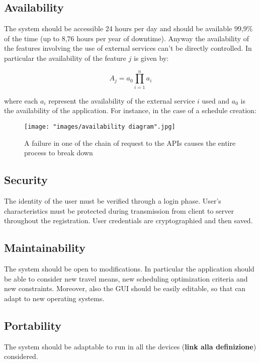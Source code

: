\subsection{Availability}
The system should be accessible 24 hours per day and should be available 99,9\% of the time (up to 8,76 hours per year of downtime). Anyway the availability of the features involving the use of external services can't be directly controlled. In particular the availability of the feature $j$ is given by:

\begin{equation}
A_j = a_0 \prod_{i=1}^n a_i 
\end{equation} 

where each $a_i$ represent the availability of the external service $i$ used and $a_0$ is the availability of the application. For instance, in the case of a schedule creation:

\begin{figure}[H]
\begin{center}
\texttt{[image: "images/availability diagram".jpg]}
\caption{A failure in one of the chain of request to the APIs causes the entire process to break down}
\end{center}
\end{figure}

\subsection{Security}
The identity of the user must be verified through a login phase.
User's characteristics must be protected during transmission from client to server throughout the registration. User credentials are cryptographied and then saved.
\subsection{Maintainability}
The system should be open to modifications.
In particular the application should be able to consider new travel means, new scheduling optimization criteria and new constraints.
Moreover, also the GUI should be easily editable, so that can adapt to new operating systems.

\subsection{Portability}
The system should be adaptable to run in all the devices (\textbf{link alla definizione}) considered.
